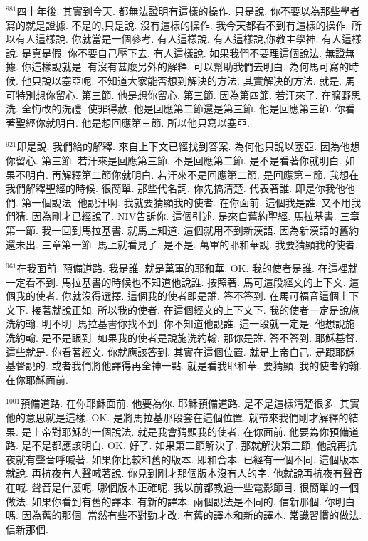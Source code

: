 \documentclass{book}
\begin{document}
$^{881}$四十年後.
其實到今天.
都無法證明有這樣的操作.
只是說.
你不要以為那些學者寫的就是證據.
不是的,只是說.
沒有這樣的操作.
我今天都看不到有這樣的操作.
所以有人這樣說.
你就當是一個參考.
有人這樣說.
有人這樣說,你教主學神.
有人這樣說.
是真是假.
你不要自己壓下去.
有人這樣說.
如果我們不要理這個說法.
無證無據.
你這樣說就是.
有沒有甚麼另外的解釋.
可以幫助我們去明白.
為何馬可寫的時候.
他只說以塞亞呢.
不知道大家能否想到解決的方法.
其實解決的方法.
就是.
馬可特別想你留心.
第三節.
他是想你留心.
第三節.
因為第四節.
若汗來了.
在曠野思洗.
全悔改的洗禮.
使罪得赦.
他是回應第二節還是第三節.
他是回應第三節.
你看著聖經你就明白.
他是想回應第三節.
所以他只寫以塞亞.

$^{921}$即是說.
我們給的解釋.
來自上下文已經找到答案.
為何他只說以塞亞.
因為他想你留心.
第三節.
若汗來是回應第三節.
不是回應第二節.
是不是看著你就明白.
如果不明白.
再解釋第二節你就明白.
若汗來不是回應第二節.
是回應第三節.
我想在我們解釋聖經的時候.
很簡單.
那些代名詞.
你先搞清楚.
代表著誰.
即是你我他他們.
第一個說法.
他說汗啊.
我就要猜顯我的使者.
在你面前.
這個我是誰.
又不用我們猜.
因為剛才已經說了.
NIV告訴你.
這個引述.
是來自舊約聖經.
馬拉基書.
三章第一節.
我一回到馬拉基書.
就馬上知道.
這個就用不到新漢語.
因為新漢語的舊約還未出.
三章第一節.
馬上就看見了.
是不是.
萬軍的耶和華說.
我要猜顯我的使者.

$^{961}$在我面前.
預備道路.
我是誰.
就是萬軍的耶和華.
OK.
我的使者是誰.
在這裡就一定看不到.
馬拉基書的時候也不知道他說誰.
按照著.
馬可這段經文的上下文.
這個我的使者.
你就沒得選擇.
這個我的使者即是誰.
答不答到.
在馬可福音這個上下文下.
接著就說正如.
所以我的使者.
在這個經文的上下文下.
我的使者一定是說施洗約翰.
明不明.
馬拉基書你找不到.
你不知道他說誰.
這一段就一定是.
他想說施洗約翰.
是不是跟到.
如果我的使者是說施洗約翰.
那你是誰.
答不答到.
耶穌基督.
這些就是.
你看著經文.
你就應該答到.
其實在這個位置.
就是上帝自己.
是跟耶穌基督說的.
或者我們將他譯得再全神一點.
就是看我耶和華.
要猜顯.
我的使者約翰.
在你耶穌面前.

$^{1001}$預備道路.
在你耶穌面前.
他要為你.
耶穌預備道路.
是不是這樣清楚很多.
其實他的意思就是這樣.
OK.
是將馬拉基那段套在這個位置.
就帶來我們剛才解釋的結果.
是上帝對耶穌的一個說法.
就是我會猜顯我的使者.
在你面前.
他要為你預備道路.
是不是都應該明白.
OK.
好了.
如果第二節解決了.
那就解決第三節.
他說再抗夜就有聲音呼喊著.
如果你比較和舊的版本.
即和合本.
已經有一個不同.
這個版本就說.
再抗夜有人聲喊著說.
你見到剛才那個版本沒有人的字.
他就說再抗夜有聲音在喊.
聲音是什麼呢.
哪個版本正確呢.
我以前都教過一些電影節目.
很簡單的一個做法.
如果你看到有舊的譯本.
有新的譯本.
兩個說法是不同的.
信新那個.
你明白嗎.
因為舊的那個.
當然有些不對勁才改.
有舊的譯本和新的譯本.
常識習慣的做法.
信新那個.
\end{document}
